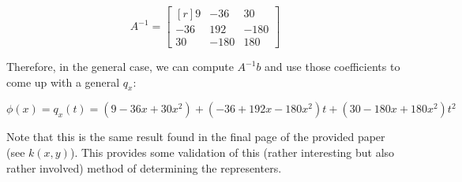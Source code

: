 \documentclass[fleqn]{homework}
\begin{document}
\begin{problem}{4}
\begin{enumerate}[(a)]
      \begin{equation*}
        A^{-1} = \begin{bmatrix*}[r] 9 & -36 & 30 \\ -36 & 192 & -180 \\ 30 &-180 & 180 \end{bmatrix*}
      \end{equation*}

      Therefore, in the general case, we can compute $A^{-1}b$ and use those
      coefficients to come up with a general $q_x$:

      \begin{equation*}
        \phi(x) = q_x(t) = (9 - 36x + 30x^2) + (-36 + 192x - 180x^2)t + (30 -
        180x + 180x^2)t^2
      \end{equation*}

      Note that this is the same result found in the final page of the provided
      paper (see $k(x,y)$).  This provides some validation of this (rather
      interesting but also rather involved) method of determining the
      representers.
    \end{enumerate}
  \end{problem}
\end{document}
